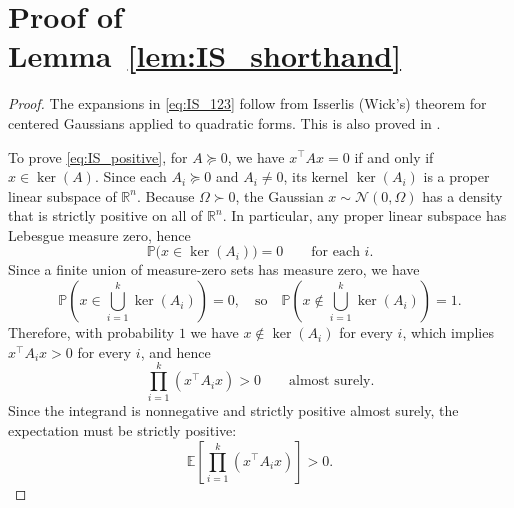 \section{Proof of Lemma~\ref{lem:IS_shorthand} }
\label{sec:app-proof-IS-shorthand}

\begin{proof}
    
The expansions in \eqref{eq:IS_123} follow from Isserlis (Wick's) theorem for centered Gaussians applied to
quadratic forms. This is also proved in \cite{magnus78report-gaussianmoments}.

To prove \eqref{eq:IS_positive}, for $A\succeq 0$, we have $x^\top A x = 0$ if and only if $x \in \ker(A)$.
Since each $A_i \succeq 0$ and $A_i\neq 0$, its kernel $\ker(A_i)$ is a proper linear
subspace of $\mathbb{R}^n$. Because $\Omega \succ 0$, the Gaussian $x\sim\mathcal{N}(0,\Omega)$ has a density that is
strictly positive on all of $\mathbb{R}^n$. In particular, any proper linear subspace has
Lebesgue measure zero, hence
\[
\mathbb{P}\big(x \in \ker(A_i)\big) = 0 \qquad \text{for each } i.
\]
Since a finite union of measure-zero sets has measure zero, we have
\[
\mathbb{P}\!\left(x \in \bigcup_{i=1}^k \ker(A_i)\right) = 0,
\quad\text{so}\quad
\mathbb{P}\!\left(x \notin \bigcup_{i=1}^k \ker(A_i)\right) = 1.
\]
Therefore, with probability $1$ we have $x \notin \ker(A_i)$ for every $i$, which implies
$x^\top A_i x > 0$ for every $i$, and hence
\[
\prod_{i=1}^k (x^\top A_i x) > 0 \qquad \text{almost surely.}
\]
Since the integrand is nonnegative and strictly positive almost surely, the expectation must be strictly positive:
\[
\mathbb{E}\!\left[\prod_{i=1}^k (x^\top A_i x)\right] > 0.
\]
\end{proof}